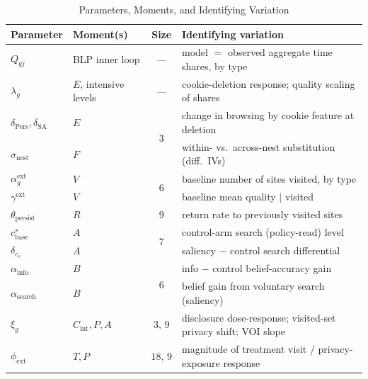 \documentclass[12pt]{article}
\theoremstyle{definition}
\theoremstyle{remark}
\begin{document}
{\begin{table}[ht]
\centering
\caption{Parameters, Moments, and Identifying Variation}\label{tab:em_identification}
\begin{tabular}{@{}llcl@{}}
\toprule
Parameter & Moment(s) & Size & Identifying variation \\
\midrule
$Q_{gj}$ & BLP inner loop & --- & model $=$ observed aggregate time shares, by type \\
$\lambda_g$ & $E$, intensive levels & --- & cookie-deletion response; quality scaling of shares \\
$\delta_{\text{Pers}}, \delta_{\text{SA}}$ & $E$ & \multirow{2}{*}{$3$} & change in browsing by cookie feature at deletion \\
$\sigma_{\text{nest}}$ & $F$ & $6$ & within- vs.\ across-nest substitution (diff.\ IVs) \\
$\alpha^{\text{ext}}_g$ & $V$ & \multirow{2}{*}{$6$} & baseline number of sites visited, by type \\
$\gamma^{\text{ext}}$ & $V$ & & baseline mean quality $\mid$ visited \\
$\theta_{\text{persist}}$ & $R$ & $9$ & return rate to previously visited sites \\
$c^s_{\text{base}}$ & $A$ & \multirow{2}{*}{$7$} & control-arm search (policy-read) level \\
$\delta_{c_s}$ & $A$ & & saliency $-$ control search differential \\
$\alpha_{\text{info}}$ & $B$ & \multirow{2}{*}{$6$} & info $-$ control belief-accuracy gain \\
$\alpha_{\text{search}}$ & $B$ & & belief gain from voluntary search (saliency) \\
$\xi_g$ & $C_{\text{int}}, P, A$ & $3{,}\,9$ & disclosure dose-response; visited-set privacy shift; VOI slope \\
$\phi_{\text{ext}}$ & $T, P$ & $18{,}\,9$ & magnitude of treatment visit / privacy-exposure response \\
\bottomrule
\end{tabular}
\end{table}

}
\end{document}
